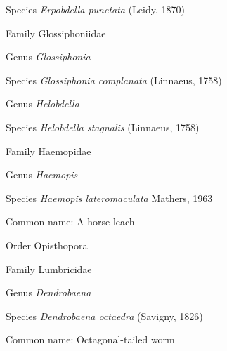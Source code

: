 \documentclass[9pt, article]{memoir}
\begin{document}
\begin{multicols}{2}
\vspace{6pt}\noindent\hspace{36pt}Species \textit{Erpobdella punctata} (Leidy, 1870)


\vspace{6pt}\noindent\hspace{24pt}Family Glossiphoniidae


\vspace{6pt}\noindent\hspace{30pt}Genus \textit{Glossiphonia}


\vspace{6pt}\noindent\hspace{36pt}Species \textit{Glossiphonia complanata} (Linnaeus, 1758)


\vspace{6pt}\noindent\hspace{30pt}Genus \textit{Helobdella}


\vspace{6pt}\noindent\hspace{36pt}Species \textit{Helobdella stagnalis} (Linnaeus, 1758)


\vspace{6pt}\noindent\hspace{24pt}Family Haemopidae


\vspace{6pt}\noindent\hspace{30pt}Genus \textit{Haemopis}


\vspace{6pt}\noindent\hspace{36pt}Species \textit{Haemopis lateromaculata} Mathers, 1963


Common name: A horse leach

\vspace{6pt}\noindent\hspace{18pt}Order Opisthopora


\vspace{6pt}\noindent\hspace{24pt}Family Lumbricidae


\vspace{6pt}\noindent\hspace{30pt}Genus \textit{Dendrobaena}


\vspace{6pt}\noindent\hspace{36pt}Species \textit{Dendrobaena octaedra} (Savigny, 1826)


Common name: Octagonal-tailed worm


\end{multicols}
\end{document}
